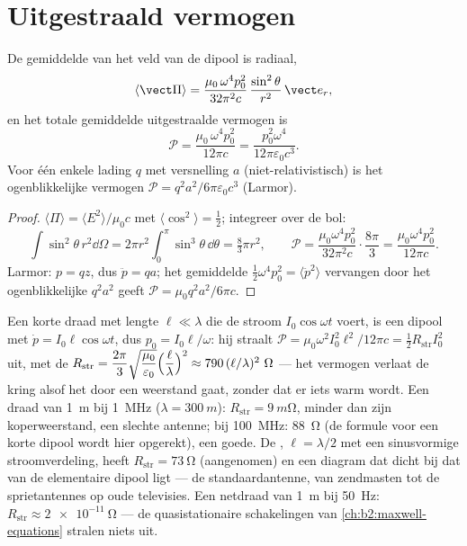 \section{Uitgestraald vermogen}

\begin{proposition}\label{prop:b2:dipole-radiation:power}
De gemiddelde  van het veld van de dipool is radiaal,
\[
\langle\vect\Pi\rangle = \frac{\mu_0\,\omega^4p_0^2}{32\pi^2c}\,\frac{\sin^2\theta}{r^2}\,\vect e_r ,
\]
en het totale gemiddelde uitgestraalde vermogen is
\[
\mathcal P = \frac{\mu_0\,\omega^4p_0^2}{12\pi c} = \frac{p_0^2\omega^4}{12\pi\varepsilon_0c^3} .
\]
Voor één enkele lading $q$ met versnelling $a$ (niet-relativistisch) is het
ogenblikkelijke vermogen $\mathcal P = q^2a^2/6\pi\varepsilon_0c^3$
(Larmor).
\end{proposition}

\begin{proof}
$\langle\Pi\rangle = \langle E^2\rangle/\mu_0c$ met
$\langle\cos^2\rangle = \tfrac12$; integreer over de bol:
\[
\int\sin^2\theta\,r^2\dd\Omega = 2\pi r^2\int_0^\pi\sin^3\theta\,\dd\theta = \tfrac83\pi r^2 ,
\qquad
\mathcal P = \frac{\mu_0\omega^4p_0^2}{32\pi^2c}\cdot\frac{8\pi}3 = \frac{\mu_0\omega^4p_0^2}{12\pi c} .
\]
Larmor: $p = qz$, dus $\ddot p = qa$; het gemiddelde
$\tfrac12\omega^4p_0^2 = \langle\ddot p^2\rangle$ vervangen door het
ogenblikkelijke $q^2a^2$ geeft $\mathcal P = \mu_0q^2a^2/6\pi c$.
\end{proof}

\begin{example}\label{ex:b2:dipole-radiation:antenna}
Een korte draad met lengte $\ell \ll \lambda$ die de stroom
$I_0\cos\omega t$ voert, is een dipool met $\dot p = I_0\ell\cos\omega t$,
dus $p_0 = I_0\ell/\omega$: hij straalt
$\mathcal P = \mu_0\omega^2I_0^2\ell^2/12\pi c = \tfrac12R_{\text{str}}I_0^2$
uit, met de \emph{}
$R_{\text{str}} = \dfrac{2\pi}3\sqrt{\dfrac{\mu_0}{\varepsilon_0}}
\Bigl(\dfrac\ell\lambda\Bigr)^2 \approx 790\,(\ell/\lambda)^2\ \Omega$
--- het vermogen verlaat de kring alsof het door een weerstand gaat, zonder
dat er iets warm wordt. Een draad van \qty{1}{m} bij \qty{1}{MHz}
($\lambda = \qty{300}{m}$): $R_{\text{str}} = \qty{9}{m\ohm}$, minder dan
zijn koperweerstand, een slechte antenne; bij \qty{100}{MHz}: \qty{88}{\ohm}
(de formule voor een korte dipool wordt hier opgerekt), een goede. De
\emph{}, $\ell = \lambda/2$ met een sinusvormige
stroomverdeling, heeft $R_{\text{str}} = \qty{73}{\ohm}$ (aangenomen) en een
diagram dat dicht bij dat van de elementaire dipool ligt --- de
standaardantenne, van zendmasten tot de sprietantennes op oude televisies.
Een netdraad van \qty{1}{m} bij \qty{50}{Hz}:
$R_{\text{str}} \approx \qty{2e-11}{\ohm}$ --- de quasistationaire
schakelingen van \cref{ch:b2:maxwell-equations} stralen niets uit.
\end{example}

